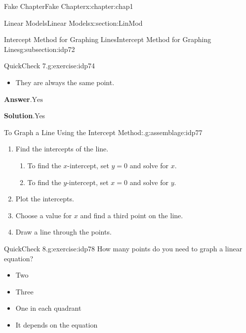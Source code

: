 \documentclass[oneside,10pt,]{book}
\newcommand{\blocktitlefont}{\relax}
\numberwithin{equation}{section}
\begin{document}
\begin{chapterptx}{Fake Chapter}{}{Fake Chapter}{}{}{x:chapter:chap1}
\begin{sectionptx}{Linear Models}{}{Linear Models}{}{}{x:section:LinMod}
\begin{subsectionptx}{Intercept Method for Graphing Lines}{}{Intercept Method for Graphing Lines}{}{}{g:subsection:idp72}
\begin{inlineexercise}{QuickCheck 7.}{g:exercise:idp74}
\begin{itemize}[label=$\odot$,leftmargin=3em,]
\item{}They are always the same point.%

\end{itemize}
%
\par\smallskip%
\noindent\textbf{\blocktitlefont Answer}.\hypertarget{g:answer:idp75}{}\quad{}\(\text{Yes}\)%
\par\smallskip%
\noindent\textbf{\blocktitlefont Solution}.\hypertarget{g:solution:idp76}{}\quad{}Yes%
\end{inlineexercise}%
\begin{assemblage}{To Graph a Line Using the Intercept Method:.}{g:assemblage:idp77}%
%
\begin{enumerate}[label=\arabic*]
\item{}Find the intercepts of the line.%
\begin{enumerate}[label=\alph*]
\item{}To find the \(x\)-intercept, set \(y=0\) and solve for \(x\).%
\item{}To find the \(y\)-intercept, set \(x=0\) and solve for \(y\).%
\end{enumerate}
%
\item{}Plot the intercepts.%
\item{}Choose a value for \(x\) and find a third point on the line.%
\item{}Draw a line through the points.%
\end{enumerate}
%
\end{assemblage}
\begin{inlineexercise}{QuickCheck 8.}{g:exercise:idp78}%
How many points do you need to graph a linear equation?%
\par
\begin{itemize}[label=$\odot$,leftmargin=3em,]
\item{}Two%

\item{}Three%

\item{}One in each quadrant%

\item{}It depends on the equation%


\end{itemize}
\end{inlineexercise}
\end{subsectionptx}
\end{sectionptx}
\end{chapterptx}
\end{document}
